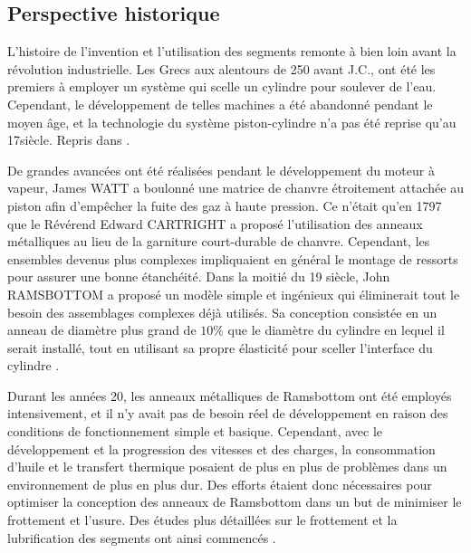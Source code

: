 \subsection{Perspective historique}
L’histoire de l'invention et l'utilisation des segments remonte à bien loin avant la révolution industrielle. Les Grecs aux alentours de 250 avant J.C., ont été les premiers à employer un système qui scelle un cylindre pour soulever de l'eau. Cependant, le développement de telles machines a été abandonné pendant le moyen âge, et la technologie du système piston-cylindre n'a pas été reprise qu'au 17siècle. Repris dans \cite{ayad2}.

De grandes avancées ont été réalisées pendant le développement du moteur à vapeur, James WATT a boulonné une matrice de chanvre étroitement attachée au piston afin d'empêcher la fuite des gaz à haute pression. Ce n'était qu'en 1797 que le Révérend Edward CARTRIGHT a proposé l'utilisation des anneaux métalliques au lieu de la garniture court-durable de chanvre. Cependant, les ensembles devenus plus complexes impliquaient en général le montage de ressorts pour assurer une bonne étanchéité. Dans la moitié du 19 siècle, John RAMSBOTTOM a proposé un modèle simple et ingénieux qui éliminerait tout le besoin des assemblages complexes déjà utilisés. Sa conception consistée en un anneau de diamètre plus grand de $10\%$ que le diamètre du cylindre en lequel il serait installé, tout en utilisant sa propre élasticité pour sceller l'interface du cylindre \cite{ayad2}.

Durant les années 20, les anneaux métalliques de Ramsbottom ont été employés intensivement, et il n'y avait pas de besoin réel de développement en raison des conditions de fonctionnement simple et basique. Cependant, avec le développement et la progression des vitesses et des charges, la consommation d’huile et le transfert thermique posaient de plus en plus de problèmes dans un environnement de plus en plus dur. Des efforts étaient donc nécessaires pour optimiser la conception des anneaux de Ramsbottom dans un but de minimiser le frottement et l’usure. Des études plus détaillées sur le frottement et la lubrification des segments ont ainsi commencés \cite{ayad2}.

